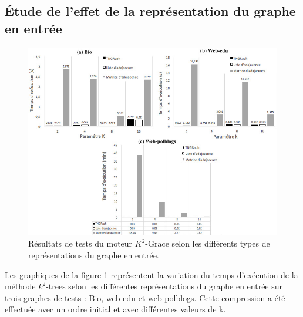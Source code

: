 	\subsection{Étude de l'effet de la représentation du graphe en entrée}
			
				\begin{figure}[H]
		\begin{center}
			
			\includegraphics[scale=0.6]{ressources/image/Tests/tst.jpg}
			\caption{Résultats de tests du moteur $K^2$-Grace selon les différents types de représentations du graphe en entrée.}
			\label{fig:test-rep}
		\end{center}
	\end{figure}
			
Les graphiques de la figure  \ref{fig:test-rep} représentent la variation du temps d'exécution de la méthode $k^2$-trees selon les différentes représentations du graphe en entrée  sur trois graphes de tests : Bio, web-edu et web-polblogs. Cette compression a été effectuée avec un ordre initial et avec différentes valeurs de k. 

